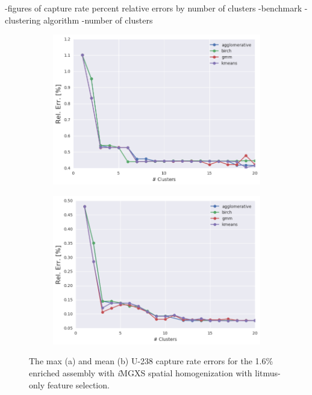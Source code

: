 -figures of capture rate percent relative errors by number of clusters
  -benchmark
  -clustering algorithm
  -number of clusters

\begin{figure}[h!]
\centering
\begin{subfigure}{0.9\textwidth}
  \centering
  \includegraphics[width=\linewidth]{figures/results/err-by-cluster/assm-16/max-rel-err}
  \caption{}
  \label{fig:chap11-max-capt-err-by-cluster-assm-16}
\end{subfigure}
\begin{subfigure}{0.9\textwidth}
  \centering
  \includegraphics[width=\linewidth]{figures/results/err-by-cluster/assm-16/mean-rel-err}
  \caption{}
  \label{fig:chap11-mean-capt-err-by-cluster-assm-16}
\end{subfigure}
\caption[U-238 capture rate errors for the 1.6\% enriched assembly]{The max (a) and mean (b) U-238 capture rate errors for the 1.6\% enriched assembly with \textit{i}\ac{MGXS} spatial homogenization with litmus-only feature selection.}
\label{fig:chap11-capt-err-by-cluster-assm-16}
\end{figure}

